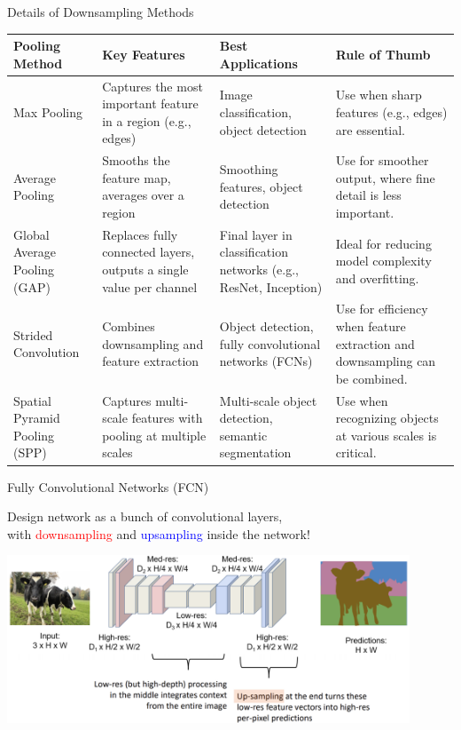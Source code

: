 \documentclass[serif, aspectratio=169]{beamer}
\begin{document}
\begin{frame}{Details of Downsampling Methods}
    \scriptsize
    \begin{table}[]
        \centering
        \renewcommand{\arraystretch}{1.2} %
        \begin{tabular}{|p{2.5cm}|p{3.5cm}|p{2.8cm}|p{3.5cm}|}
            \hline
            \textbf{Pooling Method} & \textbf{Key Features} & \textbf{Best Applications} & \textbf{Rule of Thumb} \\ \hline
            Max Pooling & Captures the most important feature in a region (e.g., edges) & Image classification, object detection & Use when sharp features (e.g., edges) are essential. \\ \hline
            Average Pooling & Smooths the feature map, averages over a region & Smoothing features, object detection & Use for smoother output, where fine detail is less important. \\ \hline
            Global Average Pooling (GAP) & Replaces fully connected layers, outputs a single value per channel & Final layer in classification networks (e.g., ResNet, Inception) & Ideal for reducing model complexity and overfitting. \\ \hline
            Strided Convolution & Combines downsampling and feature extraction & Object detection, fully convolutional networks (FCNs) & Use for efficiency when feature extraction and downsampling can be combined. \\ \hline
            Spatial Pyramid Pooling (SPP) & Captures multi-scale features with pooling at multiple scales & Multi-scale object detection, semantic segmentation & Use when recognizing objects at various scales is critical. \\ \hline
        \end{tabular}
    \end{table}
\end{frame}

\begin{frame}{Fully Convolutional Networks (FCN)}
 
    \begin{center}
      Design network as a bunch of convolutional layers,
        \\ with \textcolor{red}{downsampling} and \textcolor{blue}{upsampling} inside the network!
        \vspace{0.2cm}

        \includegraphics[width=0.9\textwidth]{pic/SS fully conv3.png}
    \end{center}

\end{frame}
\end{document}
